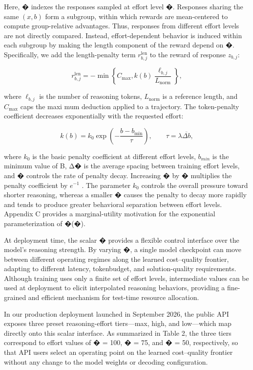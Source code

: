 \documentclass[
  10
]{article}
\begin{document}
Here, � indexes the responses sampled at effort level �. Responses
sharing the same \(( x , b )\) form a subgroup, within which rewards are
mean-centered to compute group-relative advantages. Thus, responses from
different effort levels are not directly compared. Instead,
effort-dependent behavior is induced within each subgroup by making the
length component of the reward depend on �. Specifically, we add the
length-penalty term \(r _ { b , j } ^ { \mathrm { l e n } }\) to the
reward of response \(z _ { b , j } \mathrm { : }\)

\[
r _ {b, j} ^ {\mathrm{len}} = - \min \left\{C _ {\mathrm{max}}, k (b) \frac {\ell_ {b , j}}{L _ {\mathrm{norm}}} \right\},\tag{9}
\]

where \(\ell _ { b , j }\) is the number of reasoning tokens,
\(L _ { \mathrm { n o r m } }\) is a reference length, and
\(C _ { \mathrm { m a x } }\) caps the maxi mum deduction applied to a
trajectory. The token-penalty coefficient decreases exponentially with
the requested effort:

\[
k (b) = k _ {0} \exp \left(- \frac {b - b _ {\mathrm{min}}}{\tau}\right), \qquad \tau = \lambda \overline {{\Delta b}},\tag{10}
\]

where \(k _ { 0 }\) is the basic penalty coefficient at different effort
levels, \(b _ { m i n }\) is the minimum value of B, Δ� is the average
spacing between training effort levels, and � controls the rate of
penalty decay. Increasing � by � multiplies the penalty coefficient by
\(e ^ { - 1 }\) . The parameter \(k _ { 0 }\) controls the overall
pressure toward shorter reasoning, whereas a smaller � causes the
penalty to decay more rapidly and tends to produce greater behavioral
separation between effort levels. Appendix C provides a marginal-utility
motivation for the exponential parameterization of �(�).

At deployment time, the scalar � provides a flexible control interface
over the model's reasoning strength. By varying �, a single model
checkpoint can move between different operating regimes along the
learned cost--quality frontier, adapting to different latency,
tokenbudget, and solution-quality requirements. Although training uses
only a finite set of effort levels, intermediate values can be used at
deployment to elicit interpolated reasoning behaviors, providing a
fine-grained and efficient mechanism for test-time resource allocation.

In our production deployment launched in September 2026, the public API
exposes three preset reasoning-effort tiers---max, high, and low---which
map directly onto this scalar interface. As summarized in Table 2, the
three tiers correspond to effort values of � = 100, � = 75, and � = 50,
respectively, so that API users select an operating point on the learned
cost--quality frontier without any change to the model weights or
decoding configuration.
\end{document}
